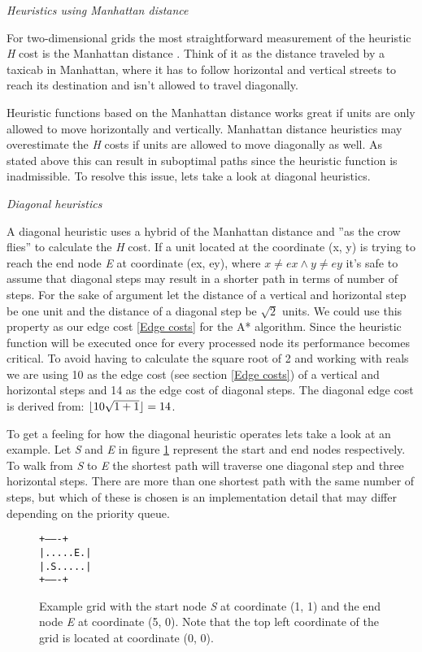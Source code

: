 \documentclass[12pt, a4paper]{article}
\DeclarePairedDelimiter{\floor}{\lfloor}{\rfloor}
\begin{document}
\textit{Heuristics using Manhattan distance}

For two-dimensional grids the most straightforward measurement of the heuristic
\textit{H} cost is the Manhattan distance \cite{manhattan}. Think of it as the
distance traveled by a taxicab in Manhattan, where it has to follow horizontal
and vertical streets to reach its destination and isn't allowed to travel
diagonally.

Heuristic functions based on the Manhattan distance works great if units are
only allowed to move horizontally and vertically. Manhattan distance heuristics
may overestimate the \textit{H} costs if units are allowed to move diagonally as
well. As stated above this can result in suboptimal paths since the heuristic
function is inadmissible. To resolve this issue, lets take a look at diagonal
heuristics.

\textit{Diagonal heuristics}

A diagonal heuristic uses a hybrid of the Manhattan distance and ''as the crow
flies'' to calculate the \textit{H} cost. If a unit located at the coordinate
(x, y) is trying to reach the end node \textit{E} at coordinate (ex, ey), where
$ x \ne ex \land y \ne ey $ it's safe to assume that diagonal steps may result
in a shorter path in terms of number of steps. For the sake of argument let the
distance of a vertical and horizontal step be one unit and the distance of a
diagonal step be $ \sqrt{2} $ units. We could use this property as our edge cost
\ref{Edge costs} for the A* algorithm. Since the heuristic function will be
executed once for every processed node its performance becomes critical. To
avoid having to calculate the square root of 2 and working with reals we are
using 10 as the edge cost (see section \ref{Edge costs}) of a vertical and
horizontal steps and 14 as the edge cost of diagonal steps. The diagonal edge
cost is derived from: $ \floor{10 \sqrt{1+1}} = 14 $.

To get a feeling for how the diagonal heuristic operates lets take a look at an
example. Let \textit{S} and \textit{E} in figure \ref{fig:grid1} represent the
start and end nodes respectively. To walk from \textit{S} to \textit{E} the
shortest path will traverse one diagonal step and three horizontal steps. There
are more than one shortest path with the same number of steps, but which of
these is chosen is an implementation detail that may differ depending on the
priority queue.

\begin{figure}[htbp]
	\centering
	\texttt{+-------+ \\
|.....E.| \\
|.S.....| \\
+-------+}
	\caption{\label{fig:grid1} Example grid with the start node \textit{S} at
	coordinate (1, 1) and the end node \textit{E} at coordinate (5, 0). Note that
	the top left coordinate of the grid is located at coordinate (0, 0).}
\end{figure}
\end{document}

